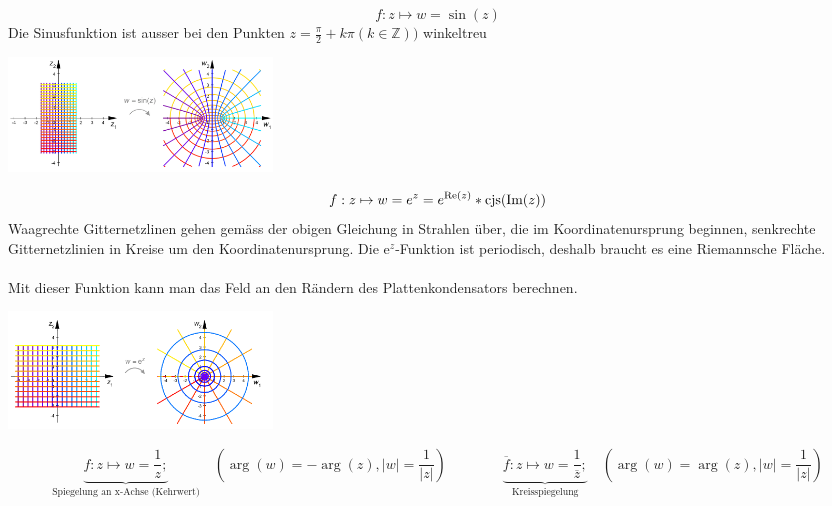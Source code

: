 	 \begin{minipage}{10cm}
		$$ f : z \mapsto w = \sin(z) $$    
		Die Sinusfunktion ist ausser bei den Punkten $z = \frac{\pi}{2}+ k\pi (k \in
		\mathbb{Z}))$ winkeltreu
	\end{minipage}
	\hspace{2cm}
	\begin{minipage}{7cm}
		\includegraphics[width=7cm]{./bilder/sinus.png} 
	
	\end{minipage}

	\begin{minipage}{11cm}
		$$ f : z \mapsto w = e^z =e^{\text{Re}(z)}*\operatorname{cjs}(\text{Im}(z))$$
		Waagrechte Gitternetzlinen gehen gemäss der obigen Gleichung in Strahlen
		über, die im Koordinatenursprung beginnen, senkrechte Gitternetzlinien in
		Kreise um den Koordinatenursprung. Die e$^z$-Funktion ist periodisch, deshalb
		braucht es eine Riemannsche Fläche.\\ \\
		Mit dieser Funktion kann man das Feld an den Rändern des Plattenkondensators
		berechnen. 
	\end{minipage}
	\hspace{1cm}
	\begin{minipage}{7cm}
		\includegraphics[width=7cm]{./bilder/exponentional.png} 		
	\end{minipage}
	$$\underbrace{f : z \mapsto w = \frac{1}{z};}_\text{Spiegelung an x-Achse (Kehrwert)} \quad (\arg(w) = -\arg(z), |w| = \frac{1}{|z|})
	\qquad \qquad 
	\underbrace{\overline{f}: z \mapsto w = \frac{1}{\overline{z}};}_\text{Kreisspiegelung}  \quad  
	(\arg(w) = \arg(z), |w| = \frac{1}{|z|}) $$\\

